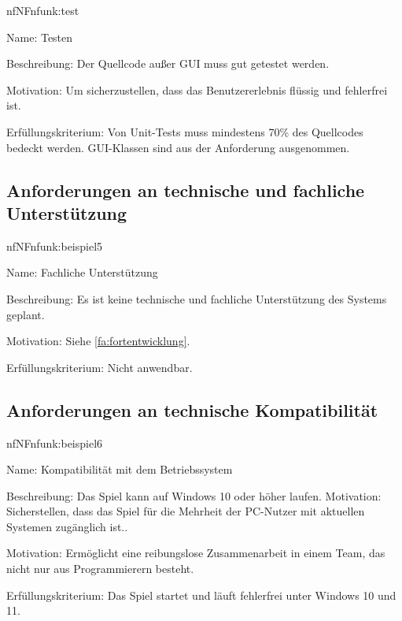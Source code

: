 \begin{description}[leftmargin=5em, style=sameline]	
	\begin{lhp}{nf}{NF}{nfunk:test}
		\item [Name:] Testen
		\item [Beschreibung:] Der Quellcode außer GUI muss gut getestet werden.
		\item [Motivation:] Um sicherzustellen, dass das Benutzererlebnis flüssig und fehlerfrei ist.
		\item [Erfüllungskriterium:] Von Unit-Tests muss mindestens 70\% des Quellcodes bedeckt werden. GUI-Klassen sind aus der Anforderung ausgenommen.
	\end{lhp}
\end{description}

\subsection{Anforderungen an technische und fachliche Unterstützung}

\begin{description}[leftmargin=5em, style=sameline]	
	\begin{lhp}{nf}{NF}{nfunk:beispiel5}
		\item [Name:] Fachliche Unterstützung
		\item [Beschreibung:] Es ist keine technische und fachliche Unterstützung des Systems geplant.
		\item [Motivation:] Siehe \ref{fa:fortentwicklung}.
		\item [Erfüllungskriterium:] Nicht anwendbar.
	\end{lhp}
\end{description}

\subsection{Anforderungen an technische Kompatibilität}

\begin{description}[leftmargin=5em, style=sameline]	
	\begin{lhp}{nf}{NF}{nfunk:beispiel6}
		\item [Name:] Kompatibilität mit dem Betriebssystem
		\item [Beschreibung:] Das Spiel kann auf Windows 10 oder höher laufen.
        Motivation: Sicherstellen, dass das Spiel für die Mehrheit der PC-Nutzer mit aktuellen Systemen zugänglich ist..
		\item [Motivation:] Ermöglicht eine reibungslose Zusammenarbeit in einem Team, das nicht nur aus Programmierern besteht.
		\item [Erfüllungskriterium:] Das Spiel startet und läuft fehlerfrei unter Windows 10 und 11.
	\end{lhp}
\end{description}

